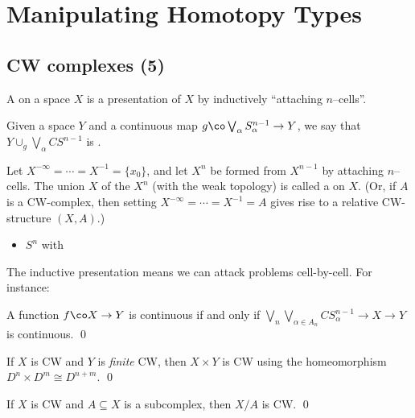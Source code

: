
\chapter{Manipulating Homotopy Types}




\section{CW complexes (5)}

A  on a space $X$ is a presentation of $X$ by inductively ``attaching $n$--cells''.

\begin{definition}
Given a space $Y$ and a continuous map $g\co \bigvee_\alpha S^{n-1}_\alpha \to Y$, we say that $Y \cup_g \bigvee_\alpha CS^{n-1}$ is .
\end{definition}

\begin{definition}
Let $X^{-\infty} = \cdots = X^{-1} = \{x_0\}$, and let $X^n$ be formed from $X^{n-1}$ by attaching $n$--cells.  The union $X$ of the $X^n$ (with the weak topology) is called a  on $X$.  (Or, if $A$ is a CW-complex, then setting $X^{-\infty} = \cdots = X^{-1} = A$ gives rise to a relative CW-structure $(X, A)$.)
\end{definition}

\begin{example}
\begin{itemize}
    \item $S^n$ with 
\end{itemize}
\end{example}

The inductive presentation means we can attack problems cell-by-cell. For instance:
\begin{corollary}
A function $f\co X \to Y$ is continuous if and only if $\bigvee_n \bigvee_{\alpha \in A_n} CS^{n-1}_\alpha \to X \to Y$ is continuous. \qed
\end{corollary}

\begin{lemma}
If $X$ is CW and $Y$ is \emph{finite} CW, then $X \times Y$ is CW using the homeomorphism $D^n \times D^m \cong D^{n+m}$. \qed
\end{lemma}

\begin{lemma}
If $X$ is CW and $A \subseteq X$ is a subcomplex, then $X/A$ is CW. \qed
\end{lemma}

